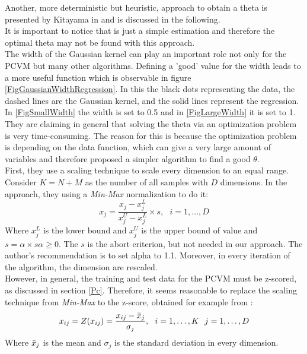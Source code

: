Another, more deterministic but heuristic, approach to obtain a theta is presented by Kitayama in \cite{Kitayama.2011} and is discussed in the following.\\
It is important to notice that is just a simple estimation and therefore the optimal theta may not be found with this approach.\\
The width of the Gaussian kernel can play an important role not only for the \acs{PCVM} but many other algorithms.
Defining a 'good' value for the width leads to a more useful function which is observable in figure \ref{FigGaussianWidthRegression}.\cite{Kitayama.2011}
In this the black dots representing the data, the dashed lines are the Gaussian kernel, and the solid lines represent the regression.
In  \ref{FigSmallWidth} the width is set to 0.5 and in \ref{FigLargeWidth} it is set to 1.\newline
They are claiming in general that solving the theta via an optimization problem is very time-consuming.
The reason for this is because the optimization problem is depending on the data function, which can give a very large amount of variables and therefore proposed a simpler algorithm to find a good $\theta$.\cite{Kitayama.2011}\\
First, they use a scaling technique to scale every dimension to an equal range.
Consider $K = N + M$ as the number of all samples with $D$ dimensions.
In the approach, they using a \textit{Min-Max} normalization to do it:\cite{Kitayama.2011}
\begin{equation}
	x_j = \frac{x_j - x_j^L}{x_j^U-x_j^L} \times s, \>\>\> i=1,\dots,D 
\end{equation}
Where $x_j^L$ is the lower bound and $x_j^U$ is the upper bound of value and $s=\alpha\times s \alpha \ge 0$.
The $s$ is the abort criterion, but not needed in our approach.
The author's recommendation is to set alpha to 1.1.
Moreover, in every iteration of the algorithm, the dimension are rescaled.\\
However, in general, the training and test data for the \acs{PCVM} must be z-scored, as discussed in section \ref{Pc}.
Therefore, it seems reasonable to replace the scaling technique from \textit{Min-Max} to the z-score, obtained for example from \cite{Mohamad.2013}:
\begin{equation}\label{EqZTrans}
x_{ij} = Z(x_{ij}) = \frac{x_{ij}-\bar{x}_j}{\sigma_j},\>\>\> i=1,\dots,K \>\>\> j=1,\dots,D
\end{equation}
Where $\bar{x}_j$ is the mean and $\sigma_j$ is the standard deviation in every dimension.\\
